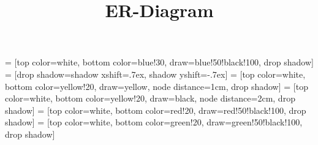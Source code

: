 \documentclass[a1]{article}
\title{ER-Diagram}
\begin{document}
\usetikzlibrary{positioning}
\usetikzlibrary{shadows}

 = [top color=white, bottom color=blue!30, 
                          		  draw=blue!50!black!100, drop shadow]
 = [drop shadow={shadow xshift=.7ex, 
                                shadow yshift=-.7ex}]
 = [top color=white, bottom color=yellow!20, 
                               draw=yellow, node distance=1cm, drop shadow]
 = [top color=white, bottom color=yellow!20, 
                               draw=black, node distance=2cm, drop shadow]
 = [top color=white, bottom color=red!20, 
                                  draw=red!50!black!100, drop shadow]
 = [top color=white, bottom color=green!20, 
                         draw=green!50!black!100, drop shadow]
\end{document}
